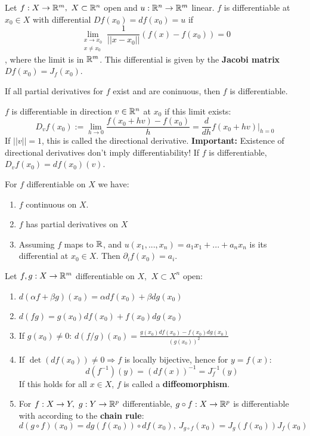 \begin{definition}[Differential]
	Let $f: X \to \mathbb{R}^m, \  X \subset \mathbb{R}^n $ open and $u: \mathbb{R}^n \to \mathbb{R}^m$ linear.
	$f$ is differentiable at $x_0 \in X$ with differential $Df(x_0) = df(x_0) = u$ if
	$$\lim_{\substack{x \to x_0 \\ x \neq x_0}} \frac{1}{||x-x_0||}(f(x) - f(x_0)) = 0$$
	, where the limit is in $\mathbb{R}^m$.
	This differential is given by the \textbf{Jacobi matrix} $Df(x_0) = J_f(x_0)$.
\end{definition}

\begin{theorem}[]
	If all partial derivatives for $f$ exist and are coninuous, then $f$ is differentiable.
\end{theorem}

\begin{definition}
	$f$ is differentiable in direction $v\in \mathbb{R}^n$ at $x_0$ if this limit exists:
	$$D_vf(x_0) := \lim_{h\to 0} \frac{f(x_0 + hv) - f(x_0)}{h} = \frac{d}{dh}f(x_0 + hv)|_{h=0}$$
	If $||v|| = 1$, this is called the directional derivative.
	\textbf{Important:} Existence of directional derivatives don't imply differentiability!
	If $f$ is differentiable, $D_vf(x_0) = df(x_0)(v)$.
\end{definition}

\begin{proposition}[]
	For $f$ differentiable on $X$ we have:
	\begin{enumerate}
		\item $f$ continuous on $X$.
		\item $f$ has partial derivatives on $X$
		\item Assuming $f$ maps to $\mathbb{R}$, and $u(x_1,...,x_n) = a_1x_1 + ... + a_nx_n$ is its differential at $x_0 \in X$.
			Then $\partial_if(x_0) = a_i$.
	\end{enumerate}
\end{proposition}

\begin{proposition}[]
	Let $f, g: X \to \mathbb{R}^m$ differentiable on $X$, $\ X \subset X^n$ open:
	\begin{enumerate}
		\item $d(\alpha f + \beta g)(x_0) = \alpha df(x_0) + \beta dg(x_0)$
		\item $d(fg) = g(x_0)df(x_0) + f(x_0)dg(x_0)$
		\item If $g(x_0) \neq 0$: $d(f/g)(x_0) =  \frac{g(x_0)df(x_0) - f(x_0)dg(x_0)}{(g(x_0))^2}$
		\item If $\det(df(x_0)) \neq 0 \Rightarrow f$ is locally bijective, hence for $y = f(x)$:
			$$d(f^{-1})(y) = (df(x))^{-1} = J^{-1}_f(y)$$
			If this holds for all $x \in X$, $f$ is called a \textbf{diffeomorphism}. 
		\item For $f: X \to Y, \ g: Y \to \mathbb{R}^p$ differentiable, $g\circ f: X \to \mathbb{R}^p$ is differentiable with according to the \textbf{chain rule}:
			$$d(g\circ f)(x_0) = dg(f(x_0))\circ df(x_0), \ J_{g\circ f}(x_0) = J_g(f(x_0))J_f(x_0)$$
	\end{enumerate}
\end{proposition}

